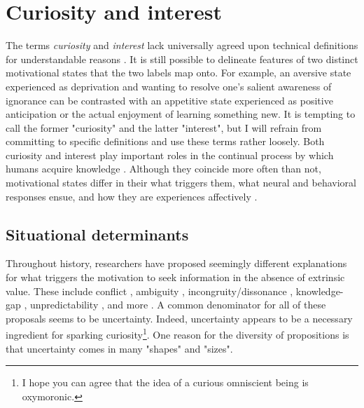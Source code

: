 \section{Curiosity and interest}\label{CH2_S_curiosity_and_interest}

The terms \emph{curiosity} and \emph{interest} lack universally agreed upon technical definitions for understandable reasons \parencite{kidd_psychology_2015,murayama_process_2019,dubey_reconciling_2020}. It is still possible to delineate features of two distinct motivational states that the two labels map onto. For example, an aversive state experienced as deprivation and wanting to resolve one's salient awareness of ignorance can be contrasted with an appetitive state experienced as positive anticipation or the actual enjoyment of learning something new. It is tempting to call the former "curiosity" and the latter "interest", but I will refrain from committing to specific definitions and use these terms rather loosely. Both curiosity and interest play important roles in the continual process by which humans acquire knowledge \parencite{murayama_process_2019}. Although they coincide more often than not, motivational states differ in their what triggers them, what neural and behavioral responses ensue, and how they are experiences affectively \parencite{day_curiosity_1982,grossnickle_disentangling_2016,hidi_interest_2019,shin_homo_2019,litman_curiosity_2019}.

\subsection{Situational determinants}\label{CH2_SS_situational_determinants}

Throughout history, researchers have proposed seemingly different explanations for what triggers the motivation to seek information in the absence of extrinsic value. These include conflict \parencite{berlyne_theory_1954}, ambiguity \parencite{ellsberg_risk_1961}, incongruity/dissonance \parencite{hunt_experience_1960,festinger_theory_1962}, knowledge-gap \parencite{loewenstein_psychology_1994}, unpredictability \parencite{shin_homo_2019}, and more \parencite[see ][for a review]{loewenstein_psychology_1994,oudeyer_what_2007,bazhydai_curiosity_2020}. A common denominator for all of these proposals seems to be uncertainty. Indeed, uncertainty appears to be a necessary ingredient for sparking curiosity\footnote{I hope you can agree that the idea of a curious omniscient being is oxymoronic.}. One reason for the diversity of propositions is that uncertainty comes in many "shapes" and "sizes".

